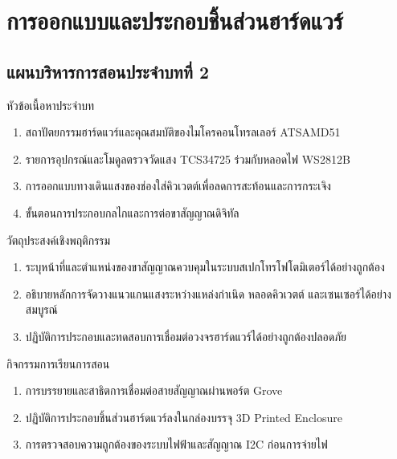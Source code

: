 \chapter{การออกแบบและประกอบชิ้นส่วนฮาร์ดแวร์}
\label{chap:ch02}

\section*{แผนบริหารการสอนประจำบทที่ 2}

\begin{planbox}{หัวข้อเนื้อหาประจำบท}
\begin{enumerate}[leftmargin=1.5em, itemsep=1pt]
    \item สถาปัตยกรรมฮาร์ดแวร์และคุณสมบัติของไมโครคอนโทรลเลอร์ ATSAMD51
    \item รายการอุปกรณ์และโมดูลตรวจวัดแสง TCS34725 ร่วมกับหลอดไฟ WS2812B
    \item การออกแบบทางเดินแสงของช่องใส่คิวเวตต์เพื่อลดการสะท้อนและการกระเจิง
    \item ขั้นตอนการประกอบกลไกและการต่อขาสัญญาณดิจิทัล
\end{enumerate}
\end{planbox}

\begin{planbox}{วัตถุประสงค์เชิงพฤติกรรม}
\begin{enumerate}[leftmargin=1.5em, itemsep=1pt]
    \item ระบุหน้าที่และตำแหน่งของขาสัญญาณควบคุมในระบบสเปกโทรโฟโตมิเตอร์ได้อย่างถูกต้อง
    \item อธิบายหลักการจัดวางแนวแกนแสงระหว่างแหล่งกำเนิด หลอดคิวเวตต์ และเซนเซอร์ได้อย่างสมบูรณ์
    \item ปฏิบัติการประกอบและทดสอบการเชื่อมต่อวงจรฮาร์ดแวร์ได้อย่างถูกต้องปลอดภัย
\end{enumerate}
\end{planbox}

\begin{planbox}{กิจกรรมการเรียนการสอน}
\begin{enumerate}[leftmargin=1.5em, itemsep=1pt]
    \item การบรรยายและสาธิตการเชื่อมต่อสายสัญญาณผ่านพอร์ต Grove
    \item ปฏิบัติการประกอบชิ้นส่วนฮาร์ดแวร์ลงในกล่องบรรจุ 3D Printed Enclosure
    \item การตรวจสอบความถูกต้องของระบบไฟฟ้าและสัญญาณ I2C ก่อนการจ่ายไฟ
\end{enumerate}
\end{planbox}

